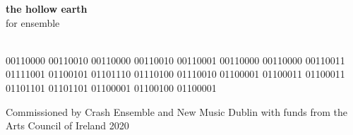 
\newcommand*{\titleTH}{\begingroup %
\raggedleft %
\vspace*{\baselineskip} %

{\LARGE\bfseries the hollow earth}\\[\baselineskip] %

{{\Huge for ensemble}}\\[\baselineskip] %

\vfill %

\plogo\\[0.5\baselineskip] %

{\small 00110000 00110010 00110000 00110010 00110001 00110000 00110000 00110011 01111001 01100101 01101110 01110100 01110010 01100001 01100011 01100011 01101101 01101101 01100001 01100100 01100001  }  %

\vspace*{3\baselineskip} %
\endgroup}


 


\frontmatter
\begin{titlepage}
\begin{center}
\pagestyle{plain} %
\titleTH %
\end{center}
\end{titlepage}

\mainmatter



\begin{dedication}

\begin{flushleft}
Commissioned by Crash Ensemble and New Music Dublin with funds from the Arts Council of Ireland 2020
\end{flushleft}


\end{dedication}

